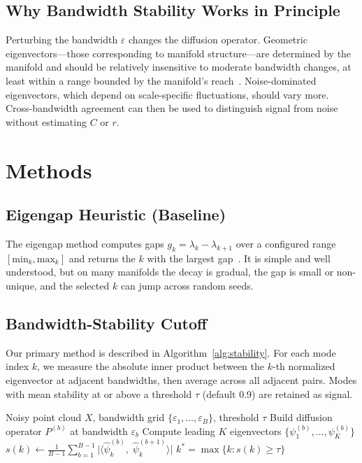 \documentclass{article}
\begin{document}
\subsection{Why Bandwidth Stability Works in Principle}

Perturbing the bandwidth $\varepsilon$ changes the diffusion operator. Geometric eigenvectors---those corresponding to manifold structure---are determined by the manifold and should be relatively insensitive to moderate bandwidth changes, at least within a range bounded by the manifold's reach~\citep{berry2016variable, niyogi2008finding}. Noise-dominated eigenvectors, which depend on scale-specific fluctuations, should vary more. Cross-bandwidth agreement can then be used to distinguish signal from noise without estimating $C$ or $r$.

\section{Methods}
\label{sec:methods}

\subsection{Eigengap Heuristic (Baseline)}

The eigengap method computes gaps $g_k = \lambda_k - \lambda_{k+1}$ over a configured range $[\text{min}_k, \text{max}_k]$ and returns the $k$ with the largest gap~\citep{vonluxburg2007tutorial}. It is simple and well understood, but on many manifolds the decay is gradual, the gap is small or non-unique, and the selected $k$ can jump across random seeds.

\subsection{Bandwidth-Stability Cutoff}
\label{sec:bandwidth_stability}

Our primary method is described in Algorithm~\ref{alg:stability}. For each mode index $k$, we measure the absolute inner product between the $k$-th normalized eigenvector at adjacent bandwidths, then average across all adjacent pairs. Modes with mean stability at or above a threshold $\tau$ (default 0.9) are retained as signal.

\begin{algorithm}[htbp]
\caption{Bandwidth-Stability Truncation}
\label{alg:stability}
\begin{algorithmic}[1]
\REQUIRE Noisy point cloud $X$, bandwidth grid $\{\varepsilon_1, \ldots, \varepsilon_B\}$, threshold $\tau$
    \STATE Build diffusion operator $P^{(b)}$ at bandwidth $\varepsilon_b$
    \STATE Compute leading $K$ eigenvectors $\{\psi_1^{(b)}, \ldots, \psi_K^{(b)}\}$
\ENDFOR
{}
    \STATE $\displaystyle s(k) \leftarrow \frac{1}{B-1} \sum_{b=1}^{B-1} \bigl|\langle \hat{\psi}_k^{(b)},\; \hat{\psi}_k^{(b+1)} \rangle\bigr|$
\ENDFOR
\RETURN $k^* = \max\{k : s(k) \geq \tau\}$
\end{algorithmic}
\end{algorithm}
\end{document}
